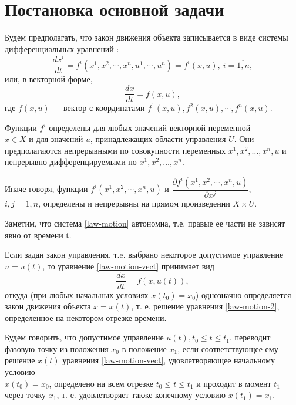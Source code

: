 \documentclass[14pt]{extreport}
\begin{document}
\section{Постановка основной задачи}
Будем предполагать, что закон движения объекта записывается в виде системы дифференциальных уравнений \cite{pontryagin}:
\begin{equation}
\label{law-motion}
\dfrac{dx^i}{dt}=f^i(x^1,x^2,\cdots,x^n,u^1,\cdots,u^n)=f^i(x,u),\ i=\overline{1,n},
\end{equation}
или, в векторной форме,
\begin{equation}
\label{law-motion-vect}
\dfrac{dx}{dt}=f(x,u),
\end{equation}
где $f(x,u)$ — вектор с координатами $f^1(x,u),f^2(x,u),\cdots,f^n(x,u)$.

Функции $f^{i}$ определены для любых значений векторной переменной\\ $x \in X$ и для значений $u$, принадлежащих области управления $U$. Они предполагаются непрерыв­ными по совокупности переменных $x^{1},x^{2},\dots,x^{n},u$
и непрерывно дифференцируемыми по $x^{1},x^{2},\dots,x^{n}$.

Иначе говоря, функции $f^i(x^1,x^2,\cdots,x^n,u)$ и $\dfrac{\partial f^i(x^1,x^2,\cdots,x^n,u)}{\partial x^j}$,\\ $i,j=\overline{1,n}$, определены и непрерывны на прямом произведении $X \times U$.

Заметим, что система \eqref{law-motion} автономна, т.е. правые ее части не зависят явно от времени t.

Если задан закон управления, т.e. выбрано некото­рое допустимое управление $u = u(t)$, то уравнение \eqref{law-motion-vect} принимает вид
\begin{equation}
\label{law-motion-2}
\dfrac{dx}{dt}=f(x,u(t)),
\end{equation}
откуда (при любых начальных условиях $x(t_{0}) = x_{0}$)
однозначно определяется закон движения объекта $x = x(t)$, т. е. решение уравнения \eqref{law-motion-2}, определенное на некотором отрезке времени.

Будем говорить, что допустимое управление $u(t),t_{0}\leq t\leq t_{1}$, переводит фазовую точку из положения $x_{0}$ в положение $x_{1}$, если соответствующее ему решение $x(t)$ уравнения \eqref{law-motion-vect}, удовлетворяющее начальному условию\\ $x(t_{0}) = x_{0}$, определено на всем отрезке $t_{0}\leq t \leq t_{1}$ и проходит в момент $t_{1}$ через точку $x_{1}$, т. е. удовлетворяет также конечному условию $x(t_{1}) = x_{1}$.
\end{document}
